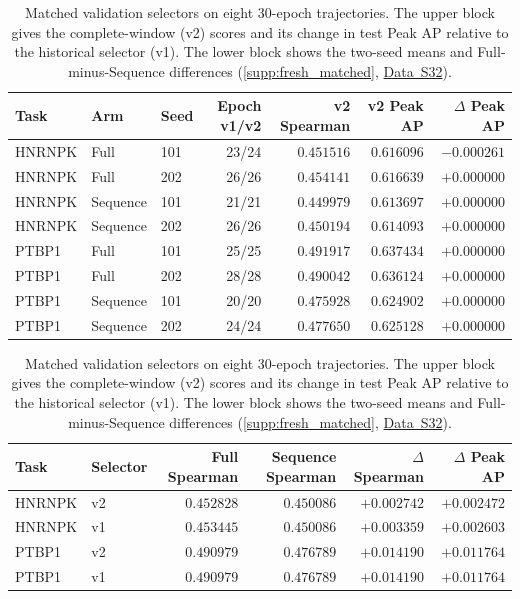 \documentclass[11pt,a4paper]{article}
\newcommand{\tableid}[1]{\setcounter{table}{\numexpr#1-1\relax}}
\newcommand{\sr}[1]{\ref{#1}}
\newcommand{\data}[1]{\hyperref[data:S#1]{Data~S#1}}
\begin{document}
\tableid{5}
\begin{table}[H]
\centering
\caption{Matched validation selectors on eight 30-epoch trajectories. The upper block gives the complete-window (v2) scores and its change in test Peak AP relative to the historical selector (v1). The lower block shows the two-seed means and Full-minus-Sequence differences (\sr{supp:fresh_matched}, \data{32}).}
\label{tab:fresh_matched_training}
\footnotesize
\setlength{\tabcolsep}{4pt}
\begin{tabular}{@{}lllrrrr@{}}
\toprule
Task & Arm & Seed & Epoch v1/v2 & v2 Spearman & v2 Peak AP & $\Delta$ Peak AP \\
\midrule
HNRNPK & Full & 101 & 23/24 & $0.451516$ & $0.616096$ & $-0.000261$ \\
HNRNPK & Full & 202 & 26/26 & $0.454141$ & $0.616639$ & $+0.000000$ \\
HNRNPK & Sequence & 101 & 21/21 & $0.449979$ & $0.613697$ & $+0.000000$ \\
HNRNPK & Sequence & 202 & 26/26 & $0.450194$ & $0.614093$ & $+0.000000$ \\
PTBP1 & Full & 101 & 25/25 & $0.491917$ & $0.637434$ & $+0.000000$ \\
PTBP1 & Full & 202 & 28/28 & $0.490042$ & $0.636124$ & $+0.000000$ \\
PTBP1 & Sequence & 101 & 20/20 & $0.475928$ & $0.624902$ & $+0.000000$ \\
PTBP1 & Sequence & 202 & 24/24 & $0.477650$ & $0.625128$ & $+0.000000$ \\
\bottomrule
\end{tabular}

\vspace{1em}
\begin{tabular}{@{}llrrrr@{}}
\toprule
Task & Selector & Full Spearman & Sequence Spearman &
$\Delta$ Spearman & $\Delta$ Peak AP \\
\midrule
HNRNPK & v2 & $0.452828$ & $0.450086$ & $+0.002742$ & $+0.002472$ \\
HNRNPK & v1 & $0.453445$ & $0.450086$ & $+0.003359$ & $+0.002603$ \\
PTBP1 & v2 & $0.490979$ & $0.476789$ & $+0.014190$ & $+0.011764$ \\
PTBP1 & v1 & $0.490979$ & $0.476789$ & $+0.014190$ & $+0.011764$ \\
\bottomrule
\end{tabular}
\end{table}
\end{document}

